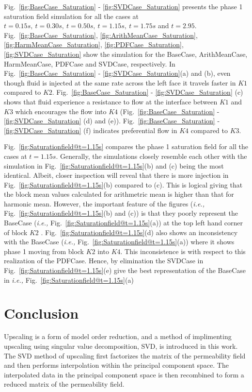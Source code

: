 \documentclass[preprint,12pt]{elsarticle}
\newcommand{\ie}{{\it i.e., }}
\begin{document}
Fig.~\ref{fig:BaseCase_Saturation} - \ref{fig:SVDCase_Saturation} presents the phase 1 saturation field simulation for all the cases at $t=0.15s,~t=0.30s,~t=0.50s,~t=1.15s,~t=1.75s$ and $t=2.95$. Fig.~\ref{fig:BaseCase_Saturation}, \ref{fig:ArithMeanCase_Saturation}, \ref{fig:HarmMeanCase_Saturation}, \ref{fig:PDFCase_Saturation}, \ref{fig:SVDCase_Saturation} show the simulation for the BaseCase, ArithMeanCase, HarmMeanCase, PDFCase and SVDCase, respectively. In Fig.~\ref{fig:BaseCase_Saturation} - \ref{fig:SVDCase_Saturation}(a) and (b), even though fluid is injected at the same rate across the left face it travels faster in $K1$ compared to $K2$. Fig.~\ref{fig:BaseCase_Saturation} - \ref{fig:SVDCase_Saturation}  (c) shows that fluid experience a resistance to flow at the interface between $K1$ and $K3$ which encourages the flow into $K4$ (Fig.~\ref{fig:BaseCase_Saturation} - \ref{fig:SVDCase_Saturation} (d) and (e)). Fig.~\ref{fig:BaseCase_Saturation} - \ref{fig:SVDCase_Saturation} (f) indicates preferential flow in $K4$ compared to $K3$.

Fig.~\ref{fig:Saturationfield@t=1.15s} compares the phase 1 saturation field for all the cases at $t=1.15s$. Generally, the simulations closely resemble each other with the simulation in Fig.~\ref{fig:Saturationfield@t=1.15s}(b) and (c) being the most identical. Albeit, closer inspection will reveal that there is more injection in Fig.~\ref{fig:Saturationfield@t=1.15s}(b) compared to (c). This is logical giving that the block mean values calculated for arithmetric mean is higher than that for harmonic mean. However, the important feature of the figures (\ie Fig.~\ref{fig:Saturationfield@t=1.15s}(b) and (c)) is that they poorly represent the BaseCase (\ie Fig.~\ref{fig:Saturationfield@t=1.15s}(a)) at the top left hand corner of block $K2$ . Fig.~\ref{fig:Saturationfield@t=1.15s}(d) also shows an inconsistency with the BaseCase (\ie Fig.~\ref{fig:Saturationfield@t=1.15s}(a)) where it shows phase 1 moving from block $K2$ into $K4$. This inconsistence is with respect to this realization of the PDFCase. Hence, by elimination the SVDCase in Fig.~\ref{fig:Saturationfield@t=1.15s}(e) give the best representation of the BaseCase in \ie Fig.~\ref{fig:Saturationfield@t=1.15s}(a)

\section{Conclusion}\label{section:conclusion}

Upscaling is a form of model order reduction, and a method of implimenting upscaling using singular value decomposition, SVD, is introduced in this work. The SVD method of upscaling first factorizes the matrix of the permeability field and then performs interpolation within the principal component space. The interpolated data in the principal component space is then recombined to form a reduced matrix of the permeability field.
\end{document}

